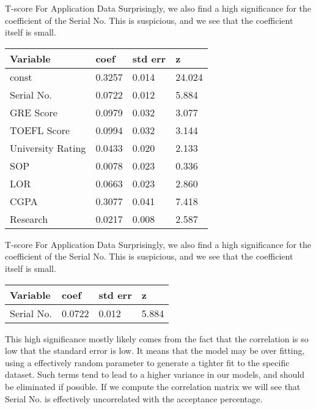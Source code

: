 \documentclass[10pt, table, dvipsnames,xcdraw, handout ]{beamer}
\begin{document}
\begin{frame}[fragile]{T-score For Application Data}
Surprisingly, we also find a high significance for the coefficient of the Serial No. \pause This is suspicious, and we see that the coefficient itself is small. 
\begin{table}[]
\begin{tabular}{llll}
\hline
\textbf{Variable} & \textbf{coef} & \multicolumn{1}{c}{\textbf{std err}} & \textbf{z} \\ \hline
const             & 0.3257        & 0.014                                & 24.024     \\
\rowcolor[HTML]{FFCCC9} 
Serial No.        & 0.0722        & 0.012                                & 5.884      \\
GRE Score         & 0.0979        & 0.032                                & 3.077      \\
TOEFL Score       & 0.0994        & 0.032                                & 3.144      \\
University Rating & 0.0433        & 0.020                                & 2.133      \\
SOP               & 0.0078        & 0.023                                & 0.336      \\
LOR               & 0.0663        & 0.023                                & 2.860      \\
CGPA              & 0.3077        & 0.041                                & 7.418      \\
Research          & 0.0217        & 0.008                                & 2.587     
\end{tabular}
\end{table}
\end{frame}


\begin{frame}[fragile]{T-score For Application Data}
Surprisingly, we also find a high significance for the coefficient of the Serial No. This is suspicious, and we see that the coefficient itself is small. 
\begin{table}[]
\begin{tabular}{llll}
\hline
\textbf{Variable} & \textbf{coef} & \multicolumn{1}{c}{\textbf{std err}} & \textbf{z} \\ \hline
\rowcolor[HTML]{FFCCC9} 
Serial No.        & 0.0722        & 0.012                                & 5.884      \\
\end{tabular}
\end{table}
This high significance mostly likely comes from the fact that the correlation is so low that the standard error is low. It means that the model may be over fitting, using a effectively random parameter to generate a tighter fit to the specific dataset. \pause Such terms tend to lead to a higher variance in our models, and should be eliminated if possible. If we compute the correlation matrix we will see that Serial No. is effectively uncorrelated with the acceptance percentage. 
\end{frame}
\end{document}
